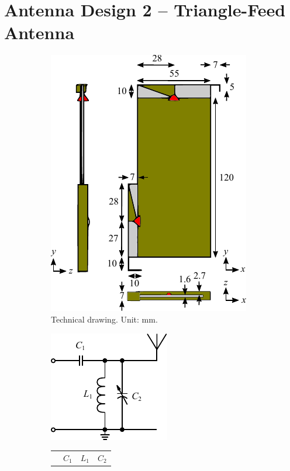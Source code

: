 \section{Antenna Design 2 -- Triangle-Feed Antenna}
\label{sec:techsol_triang}

\begin{figure}[htbp]
    \begin{subfigure}[b]{0.49\linewidth}
        \centering
        \includegraphics{img/tech_sol/trianglefeed/technical}
        \caption{Technical drawing. Unit: mm.}
        \label{fig:ant2technical}
    \end{subfigure}
    \hfill
    \begin{subfigure}[b]{0.49\linewidth}
        \centering
        \includegraphics{img/tech_sol/schematic_tuning_1}\\[1cm]
        \footnotesize
        \begin{tabular}{|l|l|l|l|}
            \hline
            & $C_1$ & $L_1$ & $C_2$ \\

\end{tabular}
\end{subfigure}
\end{figure}
